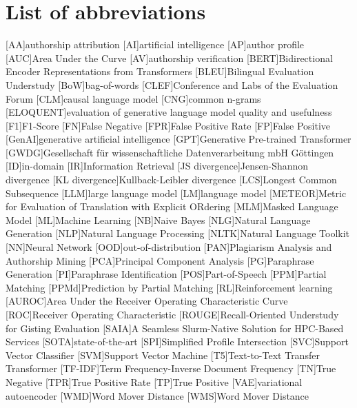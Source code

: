 \chapter*{List of abbreviations}

\begin{acronym}[XXXXXXXXX]
    [AA]{authorship attribution}
    [AI]{artificial intelligence}
    [AP]{author profile}
    [AUC]{Area Under the Curve}
    [AV]{authorship verification}
    [BERT]{Bidirectional Encoder Representations from Transformers}
    [BLEU]{Bilingual Evaluation Understudy}
    [BoW]{bag-of-words}
    [CLEF]{Conference and Labs of the Evaluation Forum}
    [CLM]{causal language model}
    [CNG]{common n-grams}
    [ELOQUENT]{evaluation of generative language model quality and usefulness}
    [F1]{F1-Score}
    [FN]{False Negative}
    [FPR]{False Positive Rate}
    [FP]{False Positive}
    [GenAI]{generative artificial intelligence}
    [GPT]{Generative Pre-trained Transformer}
    [GWDG]{Gesellschaft für wissenschaftliche Datenverarbeitung mbH Göttingen}
    [ID]{in-domain}
    [IR]{Information Retrieval}
    [JS divergence]{Jensen-Shannon divergence}
    [KL divergence]{Kullback-Leibler divergence}
    [LCS]{Longest Common Subsequence}
    [LLM]{large language model}
    [LM]{language model}
    [METEOR]{Metric for Evaluation of Translation with Explicit ORdering}
    [MLM]{Masked Language Model}
    [ML]{Machine Learning}
    [NB]{Naive Bayes}
    [NLG]{Natural Language Generation}
    [NLP]{Natural Language Processing}
    [NLTK]{Natural Language Toolkit}
    [NN]{Neural Network}
    [OOD]{out-of-distribution}
    [PAN]{Plagiarism Analysis and Authorship Mining} %
    [PCA]{Principal Component Analysis}
    [PG]{Paraphrase Generation}
    [PI]{Paraphrase Identification}
    [POS]{Part-of-Speech}
    [PPM]{Partial Matching}
    [PPMd]{Prediction by Partial Matching}
    [RL]{Reinforcement learning}
    [AUROC]{Area Under the Receiver Operating Characteristic Curve}
    [ROC]{Receiver Operating Characteristic}
    [ROUGE]{Recall-Oriented Understudy for Gisting Evaluation}
    [SAIA]{A Seamless Slurm-Native Solution for HPC-Based Services}
    [SOTA]{state-of-the-art}
    [SPI]{Simplified Profile Intersection}
    [SVC]{Support Vector Classifier}
    [SVM]{Support Vector Machine}
    [T5]{Text-to-Text Transfer Transformer}
    [TF-IDF]{Term Frequency-Inverse Document Frequency}
    [TN]{True Negative}
    [TPR]{True Positive Rate}
    [TP]{True Positive}
    [VAE]{variational autoencoder}
    [WMD]{Word Mover Distance}
    [WMS]{Word Mover Distance}
\end{acronym}
